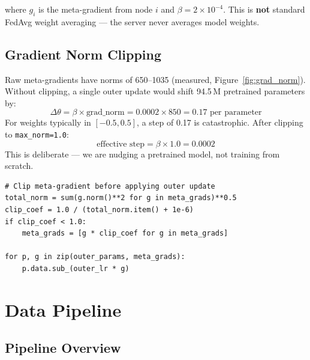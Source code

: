 \documentclass[11pt,a4paper]{article}
\theoremstyle{definition}
\begin{document}
where $g_i$ is the meta-gradient from node $i$ and $\beta = 2 \times 10^{-4}$.
This is \textbf{not} standard FedAvg weight averaging --- the server never
averages model weights.

\subsection{Gradient Norm Clipping}

Raw meta-gradients have norms of 650--1035 (measured, Figure~\ref{fig:grad_norm}).
Without clipping, a single outer update would shift 94.5\,M pretrained parameters
by:
\[
\Delta\theta = \beta \times \text{grad\_norm}
             = 0.0002 \times 850
             = 0.17 \text{ per parameter}
\]
For weights typically in $[-0.5, 0.5]$, a step of 0.17 is catastrophic.  After
clipping to \texttt{max\_norm=1.0}:
\[
\text{effective step} = \beta \times 1.0 = 0.0002
\]
This is deliberate --- we are nudging a pretrained model, not training from
scratch.

\begin{lstlisting}[style=python,caption={Outer-loop gradient clipping in
\texttt{meta\_train.py}}]
# Clip meta-gradient before applying outer update
total_norm = sum(g.norm()**2 for g in meta_grads)**0.5
clip_coef = 1.0 / (total_norm.item() + 1e-6)
if clip_coef < 1.0:
    meta_grads = [g * clip_coef for g in meta_grads]

for p, g in zip(outer_params, meta_grads):
    p.data.sub_(outer_lr * g)
\end{lstlisting}

\section{Data Pipeline}

\label{sec:data}

\subsection{Pipeline Overview}
\end{document}
